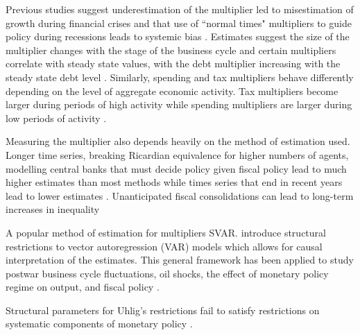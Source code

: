 
Previous studies suggest underestimation of the multiplier led to misestimation of growth during financial crises and that use of ``normal times" multipliers to guide policy during recessions leads to systemic bias \parencites{blanchard2013growth, blanchard2014learning}.  Estimates suggest the size of the multiplier changes with the stage of the business cycle and certain multipliers correlate with steady state values, with the debt multiplier increasing with the steady state debt level \parencites{baum2012fiscal, albonico2021public}.  Similarly, spending and tax multipliers behave differently depending on the level of aggregate economic activity.  Tax multipliers become larger during periods of high activity while spending multipliers are larger during low periods of activity \parencite{arin2015fiscal}.

Measuring the multiplier also depends heavily on the method of estimation used.  Longer time series, breaking Ricardian equivalence for higher numbers of agents, modelling central banks that must decide policy given fiscal policy lead to much higher estimates than most methods while times series that end in recent years lead to lower estimates \parencite{gechert2012fiscal}.  Unanticipated fiscal consolidations can lead to long-term increases in inequality \parencite{furceri2022distributional}

A popular method of estimation for multipliers SVAR.  \textcite{sims1980macroeconomics} introduce structural restrictions to vector autoregression (VAR) models which allows for causal interpretation of the estimates.  This general framework has been applied to study postwar business cycle fluctuations, oil shocks, the effect of monetary policy regime on output, and fiscal policy \parencites{hamilton1983oil, hodrick1997postwar, sims2006were,blanchard2002empirical}. 




Structural parameters for Uhlig's restrictions fail to satisfy restrictions on systematic components of monetary policy \parencite{arias2019systematic}.


